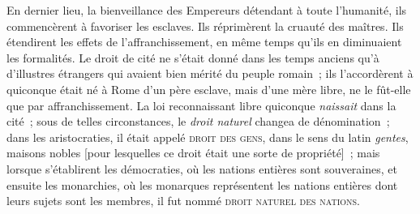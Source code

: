 \documentclass[french,twoside]{book} %
\begin{document}
 En dernier lieu, la bienveillance des Empereurs détendant à toute l’humanité, ils commencèrent à favoriser les esclaves. Ils réprimèrent la cruauté des maîtres. Ils étendirent les effets de l’affranchissement, en même temps qu’ils en diminuaient les formalités. Le droit de cité ne s’était donné dans les temps anciens qu’à d’illustres étrangers qui avaient bien mérité du peuple romain ; ils l’accordèrent à quiconque était né à Rome d’un père esclave, mais d’une mère libre, ne le fût-elle que par affranchissement. La loi reconnaissant libre quiconque {\itshape naissait} dans la cité ; sous de telles circonstances, le {\itshape droit naturel} changea de dénomination ; dans les aristocraties, il était appelé {\scshape droit des gens}, dans le sens du latin {\itshape gentes}, maisons nobles [pour lesquelles ce droit était une sorte de propriété] ; mais lorsque s’établirent les démocraties, où les nations entières sont souveraines, et ensuite les monarchies, où les monarques représentent les nations entières dont leurs sujets sont les membres, il fut nommé {\scshape droit naturel des nations}.
\end{document}
